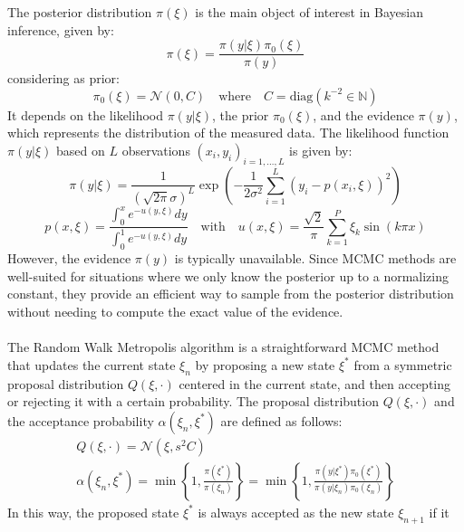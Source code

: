 \documentclass{article}
\begin{document}
The posterior distribution \(\pi(\xi)\) is the main object of interest in Bayesian inference, given by:
\begin{equation}
    \pi(\xi) = \frac{\pi(y|\xi)\pi_0(\xi)}{\pi(y)}
    \label{eq:posterior}
\end{equation}
considering as prior:
\begin{equation}
    \pi_0(\xi) = \mathcal{N}(0,C) \quad \text{where} \quad C = \text{diag}(k^{-2} \in \mathbb{N})
    \label{eq:prior}
\end{equation}
It depends on the likelihood \(\pi(y|\xi)\), the prior \(\pi_0(\xi)\), and the
evidence \(\pi(y)\), which represents the distribution of the 
measured data. The likelihood function \(\pi(y|\xi)\) based on $L$ observations $(x_i,y_i)_{i=1, \dots, L}$ is given by:
\begin{equation}
    \pi(y|\xi) = \frac{1}{(\sqrt{2\pi}\sigma)^L}\exp\left(-\frac{1}{2\sigma^2}\sum_{i=1}^{L}{(y_i-p(x_i,\xi))^2}\right)
    \label{eq:likelihood}
\end{equation}
\begin{equation}
    p(x,\xi) = \frac{\int_0^x{e^{-u(y,\xi)} dy}}{\int_0^1{e^{-u(y,\xi)} dy}} \quad \text{with} \quad u(x,\xi) = \frac{\sqrt{2}}{\pi}\sum_{k=1}^P \xi_k \sin(k \pi x)
    \label{eq:integral}
\end{equation}
However, the evidence \(\pi(y)\) is typically unavailable. Since MCMC methods are 
well-suited for situations where we only know the posterior up to a normalizing constant, they provide 
an efficient way to sample from the posterior distribution without needing to compute the exact value of 
the evidence.\\\\
The Random Walk Metropolis algorithm is a straightforward MCMC method that updates
the current state \(\xi_n\) by proposing a new state \(\xi^*\) from a symmetric proposal distribution \(Q(\xi,\cdot)\) centered in the current state,
and then accepting or rejecting it with a certain probability. The proposal distribution $Q(\xi,\cdot)$ and the acceptance probability $\alpha(\xi_n,\xi^*)$ are defined as follows:
\begin{gather*}
    Q(\xi,\cdot) = \mathcal{N}(\xi, s^2 C) \\
    \alpha(\xi_n,\xi^*) = \min\left\{1, \frac{\pi(\xi^*)}{\pi(\xi_n)}\right\}=\min\left\{1, \frac{\pi(y|\xi^*)\pi_0(\xi^*)}{\pi(y|\xi_n)\pi_0(\xi_n)}\right\}
\end{gather*}
In this way, the proposed state \( \xi^* \) is always accepted as the new state \( \xi_{n+1} \) if it 
\end{document}

